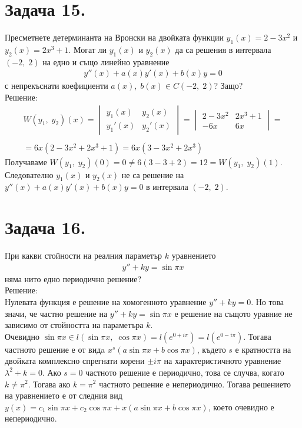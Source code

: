 \documentclass[a4paper, 12pt, oneside]{article}
\begin{document}
\section{Задача 15.}
Пресметнете детерминанта на Вронски на двойката функции
$y_1(x) = 2 - 3x^2$ и $y_2(x) = 2x^3 + 1$. Могат ли $y_1(x)$
и $y_2(x)$ да са решения в интервала $(-2, \; 2)$ на едно и
също линейно уравнение 
\begin{align*}
    y''(x) + a(x)y'(x) + b(x)y = 0
\end{align*}
с непрекъснати коефициенти $a(x), \; b(x) \in C(-2, \; 2)$? Защо? \\

Решение: \\

\begin{align*}
    W(y_1, \; y_2)(x) = \begin{vmatrix}
        y_1(x) & y_2(x) \\
        y_1'(x) & y_2'(x)
    \end{vmatrix} = \begin{vmatrix}
        2 - 3x^2 & 2x^3 + 1 \\
        -6x & 6x
    \end{vmatrix} = \\\\
    = 6x(2 - 3x^2 + 2x^3 + 1) = 6x(3 - 3x^2 + 2x^3)
\end{align*}
Получаваме $W(y_1, \; y_2)(0) = 0 \neq 6(3 - 3 + 2) = 12 = W(y_1, \; y_2)(1)$.
Следователно $y_1(x)$ и $y_2(x)$ не са решение на $y''(x) + a(x)y'(x) + b(x)y = 0$
в интервала $(-2, \; 2)$.

\section{Задача 16.}
При какви стойности на реалния параметър $k$ уравнението
\begin{align*}
    y'' + ky = \sin \pi x
\end{align*}
няма нито едно периодично решение? \\

Решение: \\

Нулевата функция е решение на хомогенното уравнение $y'' + ky = 0$.
Но това значи, че частно решение на $y'' + ky = \sin \pi x$ е решение
на същото уравние не зависимо от стойността на параметъра $k$. \\
Очевидно $\sin \pi x \in l(\sin \pi x, \; \cos \pi x) = l(e^{0 + i\pi}) = l(e^{0 - i\pi})$.
Тогава частното решение е от видa $x^s(a\sin \pi x + b\cos \pi x)$, където
$s$ е кратността на двойката комплексно спрегнати корени $\pm i\pi$ на характеристичното уравнение $\lambda^2 + k = 0$.
Ако $s = 0$ частното решение е периодично, това се случва, когато $k \neq \pi^2$.
Тогава ако $k = \pi^2$ частното решение е непериодично.
Тогава решението на уравнението е от следния вид $y(x) = c_1\sin \pi x + c_2\cos \pi x + x(a\sin \pi x + b\cos \pi x)$,
което очевидно е непериодично. \\
\end{document}
